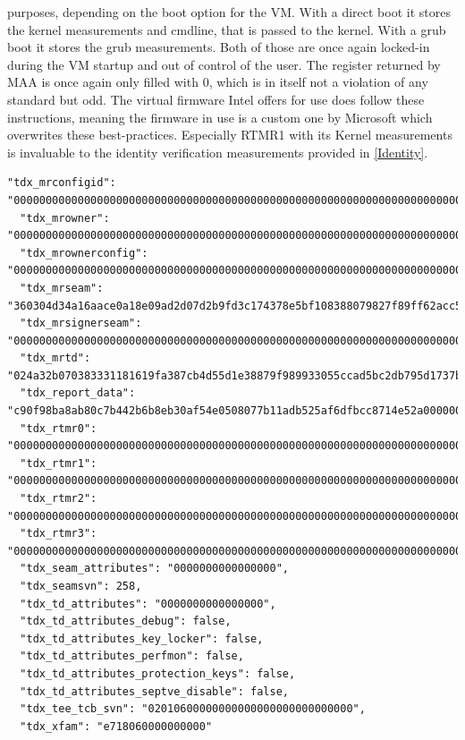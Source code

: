 purposes, depending on the boot option for the VM. With a direct boot it stores the kernel measurements and cmdline, that is passed to the kernel. With a grub boot it stores the grub measurements. Both of those are once again locked-in during the VM startup and out of control of the user. The register returned by MAA is once again only filled with 0, which is in itself not a violation of any standard but odd. The virtual firmware Intel offers for use does follow these instructions, meaning the firmware in use is a custom one by Microsoft which overwrites these best-practices. Especially RTMR1 with its Kernel measurements is invaluable to the identity verification measurements provided in \ref{Identity}. 

\begin{lstlisting}[language=jsonmain,caption={TDX generated part of an MAA quote},captionpos=b]
  "tdx_mrconfigid": "000000000000000000000000000000000000000000000000000000000000000000000000000000000000000000000000",
  "tdx_mrowner": "000000000000000000000000000000000000000000000000000000000000000000000000000000000000000000000000",
  "tdx_mrownerconfig": "000000000000000000000000000000000000000000000000000000000000000000000000000000000000000000000000",
  "tdx_mrseam": "360304d34a16aace0a18e09ad2d07d2b9fd3c174378e5bf108388079827f89ff62acc5f8c473dd40706324834e202946",
  "tdx_mrsignerseam": "000000000000000000000000000000000000000000000000000000000000000000000000000000000000000000000000",
  "tdx_mrtd": "024a32b070383331181619fa387cb4d55d1e38879f989933055ccad5bc2db795d1737b66205949d15469dc8c1ba7ab7b",
  "tdx_report_data": "c90f98ba8ab80c7b442b6b8eb30af54e0508077b11adb525af6dfbcc8714e52a0000000000000000000000000000000000000000000000000000000000000000",
  "tdx_rtmr0": "000000000000000000000000000000000000000000000000000000000000000000000000000000000000000000000000",
  "tdx_rtmr1": "000000000000000000000000000000000000000000000000000000000000000000000000000000000000000000000000",
  "tdx_rtmr2": "000000000000000000000000000000000000000000000000000000000000000000000000000000000000000000000000",
  "tdx_rtmr3": "000000000000000000000000000000000000000000000000000000000000000000000000000000000000000000000000",
  "tdx_seam_attributes": "0000000000000000",
  "tdx_seamsvn": 258,
  "tdx_td_attributes": "0000000000000000",
  "tdx_td_attributes_debug": false,
  "tdx_td_attributes_key_locker": false,
  "tdx_td_attributes_perfmon": false,
  "tdx_td_attributes_protection_keys": false,
  "tdx_td_attributes_septve_disable": false,
  "tdx_tee_tcb_svn": "02010600000000000000000000000000",
  "tdx_xfam": "e718060000000000"
\end{lstlisting}
\label{td_quote}

